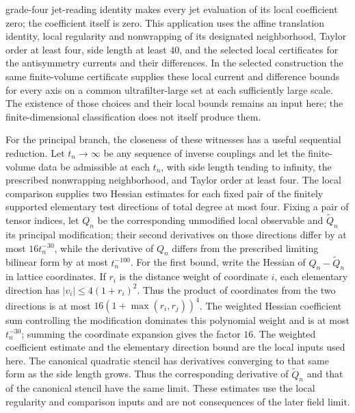grade-four jet-reading identity makes every jet evaluation of its local
coefficient zero; the coefficient itself is zero. This application uses the affine translation
identity, local regularity and nonwrapping of its designated neighborhood,
Taylor order at least four, side length at least $40$, and the selected local
certificates for the antisymmetry currents and their differences. In the selected
construction the same finite-volume certificate supplies these local current and
difference bounds for every axis on a common ultrafilter-large set at each
sufficiently large scale. The existence of those choices and their local
bounds remains an input here; the finite-dimensional classification does
not itself produce them.

For the principal branch, the closeness of these witnesses has a useful
sequential reduction. Let $t_n\to\infty$ be any sequence of inverse
couplings and let the finite-volume data be admissible at each $t_n$, with
side length tending to infinity, the prescribed nonwrapping neighborhood,
and Taylor order at least four. The local comparison supplies two Hessian
estimates for each fixed pair of the finitely supported elementary test
directions of total degree at most four. Fixing a pair of tensor indices, let $Q_n$ be the corresponding
unmodified local observable and $\widetilde Q_n$ its principal
modification; their second derivatives on those directions differ by at most $16t_n^{-30}$, while the derivative of $Q_n$ differs
from the prescribed limiting bilinear form by at most $t_n^{-100}$. For
the first bound, write the Hessian of $Q_n-\widetilde Q_n$ in lattice
coordinates. If $r_i$ is the distance weight of coordinate $i$, each
elementary direction has $|v_i|\le4(1+r_i)^2$. Thus the product of
coordinates from the two directions is at most $16(1+\max(r_i,r_j))^4$.
The weighted Hessian coefficient sum controlling the modification dominates this polynomial
weight and is at most $t_n^{-30}$; summing the coordinate expansion gives
the factor $16$. The weighted coefficient estimate and the elementary
direction bound are the local inputs used here. The
canonical quadratic stencil has derivatives converging to that same form
as the side length grows. Thus the corresponding derivative of
$\widetilde Q_n$ and that of the canonical stencil have the same limit. These estimates use the local regularity and
comparison inputs and are not consequences of the later field limit.

